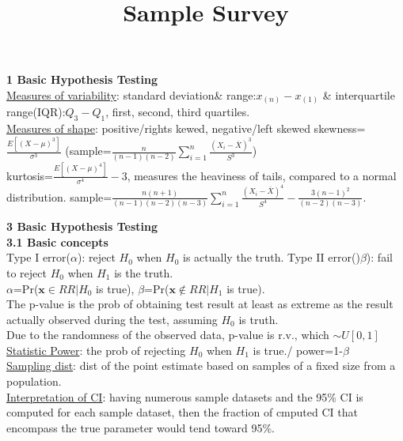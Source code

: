 \documentclass[10pt,a4paper,landscape]{article}
\title{Sample Survey}
\begin{document}
\raggedright
\footnotesize

\begin{multicols}{3}

  \setlength{\premulticols}{1pt}
  \setlength{\postmulticols}{1pt}
  \setlength{\multicolsep}{1pt}
  \setlength{\columnsep}{2pt}



{\scriptsize
	
{\small\textbf{1 Basic Hypothesis Testing}}\\
\underline{Measures of variability}: standard deviation\& range:$x_{(n)}-x_{(1)}$ \& interquartile range(IQR):$Q_3-Q_1$, first, second, third quartiles.\\
\underline{Measures of shape}: positive/rights kewed, negative/left skewed skewness=$\frac{E[(X-\mu)^3]}{\sigma^3}$ (sample=$\frac{n}{(n-1)(n-2)}\sum_{i=1}^n \frac{(X_i-\overline{X})^3}{S^3}$)\\
kurtosis=$\frac{E[(X-\mu)^4]}{\sigma^4}-3$, measures the heaviness of tails, compared to a normal distribution. sample=$\frac{n(n+1)}{(n-1)(n-2)(n-3)}\sum_{i=1}^n\frac{(X_i-\overline{X})^4}{S^4}-\frac{3(n-1)^2}{(n-2)(n-3)} $.






{\small\textbf{3 Basic Hypothesis Testing}}\\
\textbf{3.1 Basic concepts}\\
Type I error($\alpha$): reject $H_0$ when $H_0$ is actually the truth. Type II error()$\beta$): fail to reject $H_0$ when $H_1$ is the truth.\\
$\alpha$=Pr($\boldsymbol{x}\in RR|H_0$ is true), $\beta$=Pr($\boldsymbol{x}\notin RR|H_1$ is true).\\
The p-value is the prob of obtaining test result at least as extreme as the result actually observed during the test, assuming $H_0$ is truth.\\
Due to the randomness of the observed data, p-value is r.v., which $\sim U[0,1]$\\
\underline{Statistic Power}: the prob of rejecting $H_0$ when $H_1$ is true./ power=1-$\beta$\\
\underline{Sampling dist}: dist of the point estimate based on samples of a fixed size from a population.\\
\underline{Interpretation of CI}: having numerous sample datasets and the 95\% CI is computed for each sample dataset, then the fraction of cmputed CI that encompass the true parameter would tend toward 95\%.

}
\end{multicols}
\end{document}
